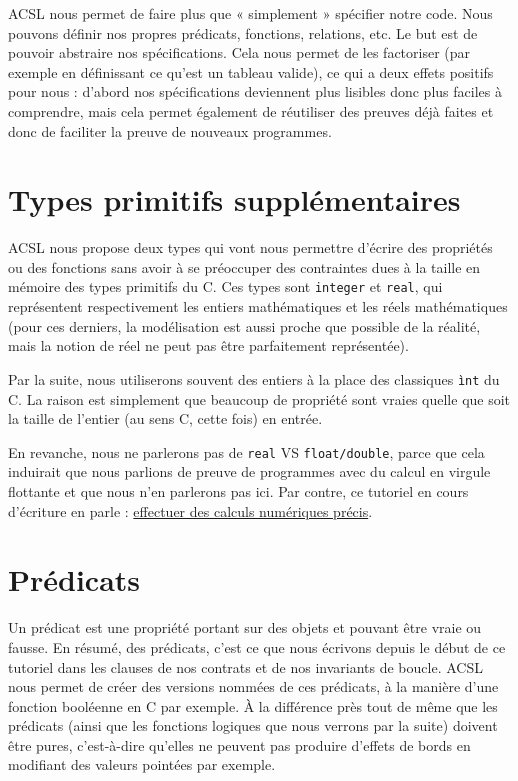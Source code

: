 \documentclass[12pt,francais,]{scrbook}
\begin{document}
ACSL nous permet de faire plus que « simplement » spécifier notre code.
Nous pouvons définir nos propres prédicats, fonctions, relations, etc.
Le but est de pouvoir abstraire nos spécifications. Cela nous permet de
les factoriser (par exemple en définissant ce qu'est un tableau valide),
ce qui a deux effets positifs pour nous : d'abord nos spécifications
deviennent plus lisibles donc plus faciles à comprendre, mais cela
permet également de réutiliser des preuves déjà faites et donc de
faciliter la preuve de nouveaux programmes.

\section{Types primitifs
supplémentaires}\label{types-primitifs-suppluxe9mentaires}

ACSL nous propose deux types qui vont nous permettre d'écrire des
propriétés ou des fonctions sans avoir à se préoccuper des contraintes
dues à la taille en mémoire des types primitifs du C. Ces types sont
\texttt{integer} et \texttt{real}, qui représentent respectivement les
entiers mathématiques et les réels mathématiques (pour ces derniers, la
modélisation est aussi proche que possible de la réalité, mais la notion
de réel ne peut pas être parfaitement représentée).

Par la suite, nous utiliserons souvent des entiers à la place des
classiques \texttt{ìnt} du C. La raison est simplement que beaucoup de
propriété sont vraies quelle que soit la taille de l'entier (au sens C,
cette fois) en entrée.

En revanche, nous ne parlerons pas de \texttt{real} VS
\texttt{float/double}, parce que cela induirait que nous parlions de
preuve de programmes avec du calcul en virgule flottante et que nous
n'en parlerons pas ici. Par contre, ce tutoriel en cours d'écriture en
parle :
\href{https://zestedesavoir.com/forums/sujet/4157/effectuer-des-calculs-numeriques-precis/}{effectuer
des calculs numériques précis}.

\section{Prédicats}\label{pruxe9dicats}

Un prédicat est une propriété portant sur des objets et pouvant être
vraie ou fausse. En résumé, des prédicats, c'est ce que nous écrivons
depuis le début de ce tutoriel dans les clauses de nos contrats et de
nos invariants de boucle. ACSL nous permet de créer des versions nommées
de ces prédicats, à la manière d'une fonction booléenne en C par
exemple. À la différence près tout de même que les prédicats (ainsi que
les fonctions logiques que nous verrons par la suite) doivent être
pures, c'est-à-dire qu'elles ne peuvent pas produire d'effets de bords
en modifiant des valeurs pointées par exemple.
\end{document}
